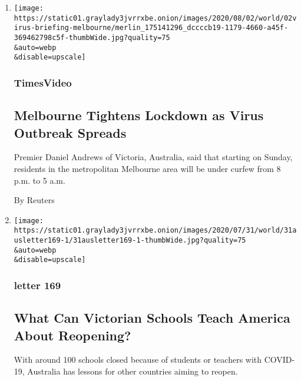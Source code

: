 \begin{enumerate}
\def\labelenumi{\arabic{enumi}.}
\item
  \href{/video/world/australia/100000007269116/coronavirus-restrictions-melbourne.html}{}

  \texttt{[image: https://static01.graylady3jvrrxbe.onion/images/2020/08/02/world/02virus-briefing-melbourne/merlin\_175141296\_dccccb19-1179-4660-a45f-369462798c5f-thumbWide.jpg?quality=75\\\&auto=webp\\\&disable=upscale]}

  \hypertarget{timesvideo}{%
  \subsubsection{TimesVideo}\label{timesvideo}}

  \hypertarget{melbourne-tightens-lockdown-as-virus-outbreak-spreads}{%
  \subsection{Melbourne Tightens Lockdown as Virus Outbreak
  Spreads}\label{melbourne-tightens-lockdown-as-virus-outbreak-spreads}}

  Premier Daniel Andrews of Victoria, Australia, said that starting on
  Sunday, residents in the metropolitan Melbourne area will be under
  curfew from 8 p.m. to 5 a.m.

  By Reuters
\item
  \href{/2020/07/30/world/australia/melbourne-schools-lessons-america.html}{}

  \texttt{[image: https://static01.graylady3jvrrxbe.onion/images/2020/07/31/world/31ausletter169-1/31ausletter169-1-thumbWide.jpg?quality=75\\\&auto=webp\\\&disable=upscale]}

  \hypertarget{letter-169}{%
  \subsubsection{letter 169}\label{letter-169}}

  \hypertarget{what-can-victorian-schools-teach-america-about-reopening}{%
  \subsection{What Can Victorian Schools Teach America About
  Reopening?}\label{what-can-victorian-schools-teach-america-about-reopening}}

  With around 100 schools closed because of students or teachers with
  COVID-19, Australia has lessons for other countries aiming to reopen.


\end{enumerate}
